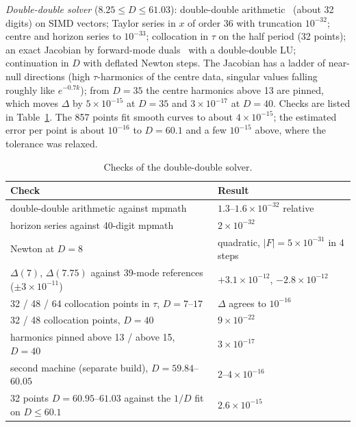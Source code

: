 \documentclass[aps,prd,onecolumn,superscriptaddress,nofootinbib,10pt]{revtex4-2}
\begin{document}
\emph{Double-double solver} ($8.25 \le D \le 61.03$): double-double arithmetic~\cite{Dekker1971} (about 32 digits) on SIMD vectors;
Taylor series in $x$ of order 36 with truncation $10^{-32}$; centre and horizon series to $10^{-33}$; collocation in
$\tau$ on the half period (32 points); an exact Jacobian by forward-mode duals~\cite{Wengert1964} with a double-double LU; continuation in
$D$ with deflated Newton steps. The Jacobian has a ladder of near-null directions (high $\tau$-harmonics of the centre
data, singular values falling roughly like $e^{-0.7k}$); from $D = 35$ the centre harmonics above 13 are pinned, which
moves $\Delta$ by $5\times10^{-15}$ at $D = 35$ and $3\times10^{-17}$ at $D = 40$. Checks are listed in
Table~\ref{tab:checks}. The 857 points fit smooth curves to about $4\times10^{-15}$; the estimated error per point is
about $10^{-16}$ to $D = 60.1$ and a few $10^{-15}$ above, where the tolerance was relaxed.

\begin{table}[t]
\caption{Checks of the double-double solver.}
\label{tab:checks}
\footnotesize
\begin{ruledtabular}
\begin{tabular}{ll}
Check & Result \\ \hline
double-double arithmetic against mpmath & $1.3$--$1.6\times10^{-32}$ relative \\
horizon series against 40-digit mpmath & $2\times10^{-32}$ \\
Newton at $D = 8$ & quadratic, $|F| = 5\times10^{-31}$ in 4 steps \\
$\Delta(7)$, $\Delta(7.75)$ against 39-mode references ($\pm3\times10^{-11}$) & $+3.1\times10^{-12}$, $-2.8\times10^{-12}$ \\
32 / 48 / 64 collocation points in $\tau$, $D = 7$--$17$ & $\Delta$ agrees to $10^{-16}$ \\
32 / 48 collocation points, $D = 40$ & $9\times10^{-22}$ \\
harmonics pinned above 13 / above 15, $D = 40$ & $3\times10^{-17}$ \\
second machine (separate build), $D = 59.84$--$60.05$ & $2$--$4\times10^{-16}$ \\
32 points $D = 60.95$--$61.03$ against the $1/D$ fit on $D \le 60.1$ & $2.6\times10^{-15}$ \\
\end{tabular}
\end{ruledtabular}
\end{table}
\end{document}
